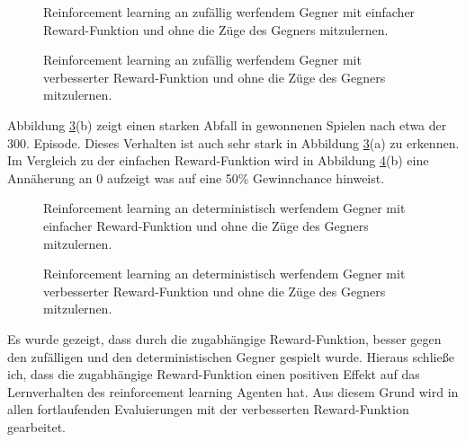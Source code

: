 \begin{figure}%
    \centering
    \qquad
    \caption{Reinforcement learning an zufällig werfendem Gegner mit einfacher Reward-Funktion und ohne die Züge des Gegners mitzulernen.}%
    \label{fig:randomFF}%
\end{figure}


\begin{figure}%
    \centering
    \qquad
    \caption{Reinforcement learning an zufällig werfendem Gegner mit verbesserter Reward-Funktion und ohne die Züge des Gegners mitzulernen.}%
    \label{fig:randomTF}%
\end{figure}

Abbildung \ref{fig:leftiFF}(b) zeigt einen starken Abfall in gewonnenen Spielen nach etwa der 300. Episode. Dieses Verhalten ist auch sehr stark in Abbildung \ref{fig:leftiFF}(a) zu erkennen.\\
Im Vergleich zu der einfachen Reward-Funktion wird in Abbildung \ref{fig:leftiTF}(b) eine Annäherung an 0 aufzeigt was auf eine 50\% Gewinnchance hinweist.\\

\begin{figure}%
    \centering
    \qquad
    \caption{Reinforcement learning an deterministisch werfendem Gegner mit einfacher Reward-Funktion und ohne die Züge des Gegners mitzulernen.}%
    \label{fig:leftiFF}%
\end{figure}

\begin{figure}%
    \centering
    \qquad
    \caption{Reinforcement learning an deterministisch werfendem Gegner mit verbesserter Reward-Funktion und ohne die Züge des Gegners mitzulernen.}%
    \label{fig:leftiTF}%
\end{figure}
Es wurde gezeigt, dass durch die zugabhängige Reward-Funktion, besser gegen den zufälligen und den deterministischen Gegner gespielt wurde.
Hieraus schließe ich, dass die zugabhängige Reward-Funktion einen positiven Effekt auf das Lernverhalten des reinforcement learning Agenten hat.
Aus diesem Grund wird in allen fortlaufenden Evaluierungen mit der verbesserten Reward-Funktion gearbeitet.


